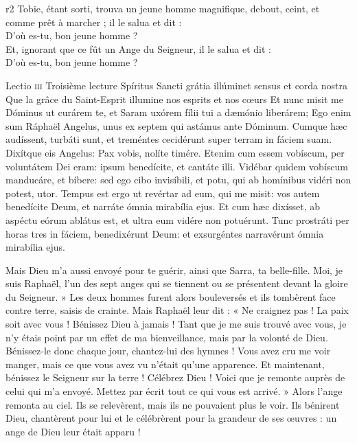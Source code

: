 \documentclass[twoside]{article}
\begin{document}
\begin{paracol}[1]{2}
{	}
	{r2}
	{\vfill
	\rr Tobie, étant sorti, trouva un jeune homme magnifique, debout, ceint, et comme prêt à marcher ; il le salua et dit :\\
	\GreSpecial{*} D’où es-tu, bon jeune homme ?\\
	\vv Et, ignorant que ce fût un Ange du Seigneur, il le salua et dit :\\
	\GreSpecial{*} D’où es-tu, bon jeune homme ?
	\vfill}

\lectioresponsorium
	{Lectio \textsc{iii}}
	{Troisième lecture}
	{Spíritus Sancti grátia illúminet sensus et corda nostra}
	{Que la grâce du Saint-Esprit illumine nos esprits et nos cœurs}
	{
		Et nunc misit me Dóminus ut curárem te, et Saram uxórem fílii tui a dæmónio liberárem;
		Ego enim sum Ráphaël Angelus, unus ex septem qui astámus ante Dóminum.
		Cumque hæc audíssent, turbáti sunt, et treméntes cecidérunt super terram in fáciem suam.
		Dixítque eis Angelus: Pax vobis, nolíte timére.
		Etenim cum essem vobíscum, per voluntátem Dei eram: ipsum benedícite, et cantáte illi.
		Vidébar quidem vobíscum manducáre, et bíbere: sed ego cibo invisíbili, et potu, qui ab homínibus vidéri non potest, utor.
		Tempus est ergo ut revértar ad eum, qui me misit: vos autem benedícite Deum, et narráte ómnia mirabília ejus.
		Et cum hæc dixísset, ab aspéctu eórum ablátus est, et ultra eum vidére non potuérunt.
		Tunc prostráti per horas tres in fáciem, benedixérunt Deum: et exsurgéntes narravérunt ómnia mirabília ejus.
	}
	{	
	
		
		Mais Dieu m’a aussi envoyé pour te guérir, ainsi que Sarra, ta belle-fille.
		Moi, je suis Raphaël, l’un des sept anges qui se tiennent ou se présentent devant la gloire du Seigneur. »
		Les deux hommes furent alors bouleversés et ils tombèrent face contre terre, saisis de crainte.
		Mais Raphaël leur dit : « Ne craignez pas ! La paix soit avec vous ! Bénissez Dieu à jamais !
		Tant que je me suis trouvé avec vous, je n’y étais point par un effet de ma bienveillance, mais par la volonté de Dieu. Bénissez-le donc chaque jour, chantez-lui des hymnes !
		Vous avez cru me voir manger, mais ce que vous avez vu n’était qu’une apparence.
		Et maintenant, bénissez le Seigneur sur la terre ! Célébrez Dieu ! Voici que je remonte auprès de celui qui m’a envoyé. Mettez par écrit tout ce qui vous est arrivé. » 
		Alors l’ange remonta au ciel.
		Ils se relevèrent, mais ils ne pouvaient plus le voir.
		Ils bénirent Dieu, chantèrent pour lui et le célébrèrent pour la grandeur de ses œuvres : un ange de Dieu leur était apparu !
	
}
\end{paracol}
\end{document}
